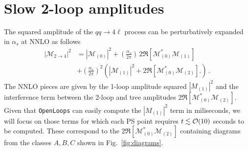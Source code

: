 \documentclass[aps,prl,twocolumn,superscriptaddress,amsfont,graphicx,preprintnumbers]{revtex4-1}
\newcommand{\mcM}{\mathcal{M}}
\newcommand{\red}[1]{{\color{Red}{#1}}}
\begin{document}
\red{How to be sure that there are no large cancellations between the ``slow" terms we fit and the rest we don't when computing at least the total NNLO part of the amplitude.}

\section{Slow 2-loop amplitudes}

The squared amplitude of the $qq\to4\ell$ process can be perturbatively expanded in $\alpha_s$ at NNLO as follows
\begin{equation}
\begin{aligned}
|\mcM_{2 \to 4}|^2 &= |\mcM_{(0)}|^2 + \left(\frac{\alpha_s}{2\pi} \right) \, 2 \Re[\mcM_{(0)}^* \mcM_{(1)}]  \\
&+\left(\frac{\alpha_s}{2\pi} \right)^2 \left(|\mcM_{(1)}|^2 + 2 \Re[\mcM_{(0)}^* \mcM_{(2)}]. \right) \,.
\label{eq:amplitude}
\end{aligned}
\end{equation}
The NNLO pieces are given by the 1-loop amplitude squared $|M_{(1)}|^2$ and the interference term between the 2-loop and tree amplitudes $2 \Re[\mcM_{(0)}^* \mcM_{(2)}]$. Given that \texttt{OpenLoops} can easily compute the $|M_{(1)}|^2$ term in miliseconds, we will focus on those terms for which each PS point requires $t \lesssim {\cal O}(10)$ seconds to be computed. These correspond to the $2 \Re[\mcM_{(0)}^* \mcM_{(2)}]$ containing diagrams from the classes $A,B,C$ shown in Fig.~\ref{fig:diagrams}.

\red{Subtlety with same sign electrons}


\end{document}
